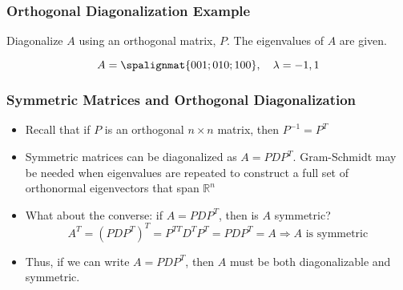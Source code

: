 \begin{frame}\frametitle{Orthogonal Diagonalization Example}

    Diagonalize $A$ using an orthogonal matrix, $P$. The eigenvalues of $A$ are given.
    
    $$A = \spalignmat{0 0 1; 0 1 0;1 0 0}, \quad \lambda = -1, 1$$
    
    
\end{frame}




\begin{frame}\frametitle{Symmetric Matrices and Orthogonal Diagonalization}

    \begin{itemize}
        \item<1-> Recall that if $ P$ is an orthogonal $ n \times n$ matrix, then $ P ^{-1} = P ^{T}$
        \item<2-> Symmetric matrices can be diagonalized as $  A = P D P ^{T}$. Gram-Schmidt may be needed when eigenvalues are repeated to construct a full set of orthonormal eigenvectors that span $\mathbb R^n$
        \item<3-> What about the converse: if $  A = P D P ^{T}$, then is $A$ symmetric? 
        $$A^T = (PDP^T)^T = P^{TT} D^T P^T = PDP^T = A \Rightarrow A \text{ is symmetric}$$
        \item<4-> Thus, if we can write $ A = P D P ^{T}$, then $A$ must be both diagonalizable and symmetric. %
    \end{itemize}
    
\end{frame}




